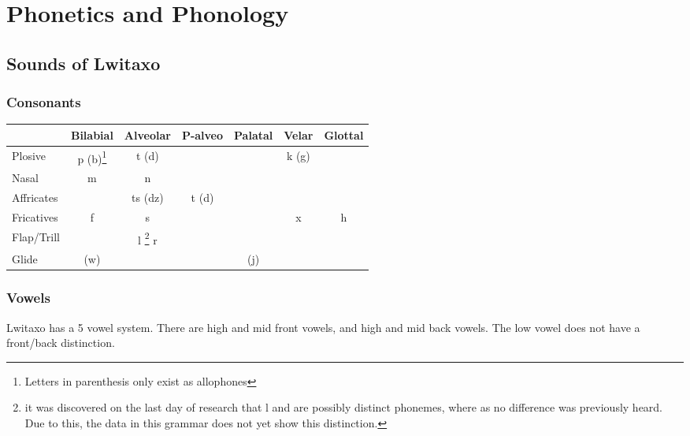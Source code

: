 \chapter{Phonetics and Phonology}
\section{Sounds of Lwitaxo}
\subsection{Consonants}\label{sec:consonants}

\begin{minipage}{\linewidth}
\begin{tabular}{|l | c | c | c | c | c | c|}
\hline & Bilabial & Alveolar & P-alveo & Palatal & Velar & Glottal \\ \hline
Plosive & p (b)\footnote{Letters in parenthesis only exist as allophones} & t (d) & & & k (g) & \\\hline
Nasal & m & n & & \palnas{} & \engma{} & \\\hline
Affricates &  & ts (dz) & t\esh{} (d\ezh{}) & & & \\ \hline
Fricatives & \beta{} f & s & \esh{} & & x & h\\ \hline
Flap/Trill & &l \alvlatflap{}\footnote{it was discovered on the last day of research that l and \alvlatflap{} are possibly distinct phonemes, where as no difference was previously heard.  Due to this, the data in this grammar does not yet show this distinction.} r & & & & \\\hline
Glide & (w) & & & (j) & & \\ \hline
\end{tabular}
\end{minipage}

\subsection{Vowels}\label{sec:vowels}

Lwitaxo has a 5 vowel system.  There are high and mid front vowels, and high and mid back vowels.  The low vowel does not have a front/back distinction.

\begin{center}
\begin{vowel}
\end{vowel}
\end{center}

